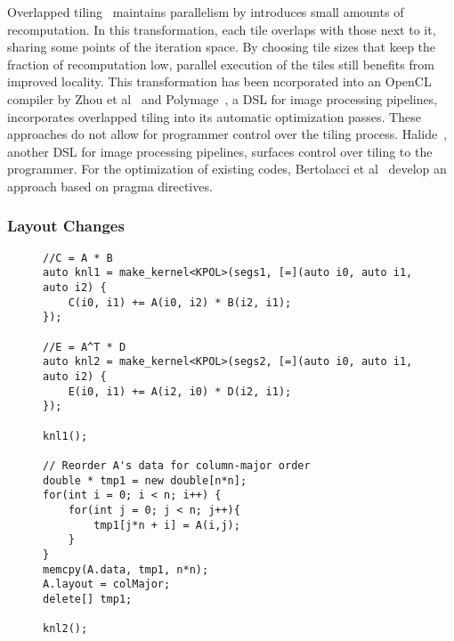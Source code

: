 Overlapped tiling~\cite{holewinski2012high,krishnamoorthy2007effective} maintains parallelism by introduces small amounts of recomputation.
In this transformation, each tile overlaps with those next to it, sharing some points of the iteration space.
By choosing tile sizes that keep the fraction of recomputation low, parallel execution of the tiles still benefits from improved locality.
This transformation has been ncorporated into an OpenCL compiler by Zhou et al~\cite{zhou2012hierarchical} and Polymage~\cite{mullapudi2015polymage}, a DSL for image processing pipelines, incorporates overlapped tiling into its automatic optimization passes.
These approaches do not allow for programmer control over the tiling process.
Halide~\cite{ragan-kelley2013halide}, another DSL for image processing pipelines, surfaces control over tiling to the programmer.
For the optimization of existing codes, Bertolacci et al~\cite{bertolacci2019using} develop an approach based on pragma directives.


\subsubsection{Layout Changes}
\begin{figure}
\begin{lstlisting}[caption={Changing a View's data layout between computations by hand.},label={FormatChangeByHand}]
//C = A * B
auto knl1 = make_kernel<KPOL>(segs1, [=](auto i0, auto i1, auto i2) {
	C(i0, i1) += A(i0, i2) * B(i2, i1);
});

//E = A^T * D
auto knl2 = make_kernel<KPOL>(segs2, [=](auto i0, auto i1, auto i2) {
	E(i0, i1) += A(i2, i0) * D(i2, i1);
});

knl1();

// Reorder A's data for column-major order
double * tmp1 = new double[n*n];
for(int i = 0; i < n; i++) {
	for(int j = 0; j < n; j++){
		tmp1[j*n + i] = A(i,j);
	}
}
memcpy(A.data, tmp1, n*n);
A.layout = colMajor;
delete[] tmp1;

knl2();
\end{lstlisting}
\end{figure}

